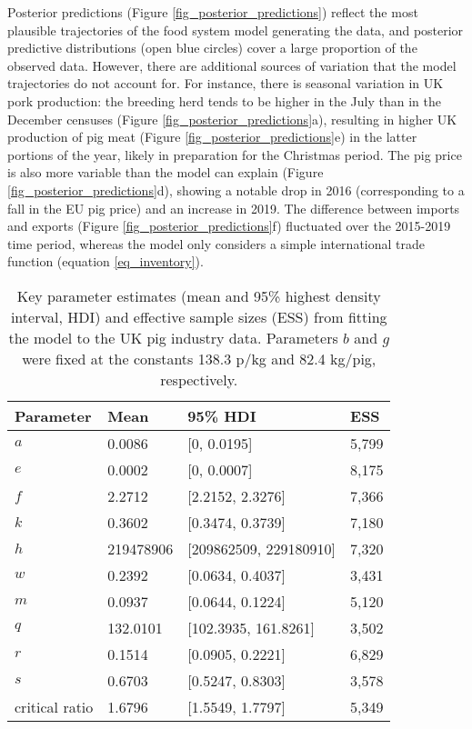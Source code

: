 \documentclass[12pt]{article}
\begin{document}
Posterior predictions (Figure \ref{fig_posterior_predictions}) reflect the most plausible trajectories of the food system model generating the data, and posterior predictive distributions (open blue circles) cover a large proportion of the observed data. However, there are additional sources of variation that the model trajectories do not account for. For instance, there is seasonal variation in UK pork production: the breeding herd tends to be higher in the July than in the December censuses (Figure \ref{fig_posterior_predictions}a), resulting in higher UK production of pig meat (Figure \ref{fig_posterior_predictions}e) in the latter portions of the year, likely in preparation for the Christmas period. The pig price is also more variable than the model can explain (Figure \ref{fig_posterior_predictions}d), showing a notable drop in 2016 (corresponding to a fall in the EU pig price) and an increase in 2019. The difference between imports and exports (Figure \ref{fig_posterior_predictions}f) fluctuated over the 2015-2019 time period, whereas the model only considers a simple international trade function (equation \ref{eq_inventory}).

\begin{table}[t!]
  \centering
  \footnotesize
  \begin{tabular}{p{5cm}p{3cm}p{5cm}p{2cm}}
    \textbf{Parameter} & \textbf{Mean} & \textbf{95\% HDI} & \textbf{ESS} \\ \hline
    $a$ & 0.0086 & [0, 0.0195] & 5,799 \\
    $e$ & 0.0002 & [0, 0.0007] & 8,175 \\
    $f$ & 2.2712 & [2.2152, 2.3276] & 7,366 \\
    $k$ & 0.3602 & [0.3474, 0.3739] & 7,180 \\
    $h$ & 219478906 & [209862509, 229180910] & 7,320 \\
    $w$ & 0.2392 & [0.0634, 0.4037] & 3,431 \\
    $m$ & 0.0937 & [0.0644, 0.1224] & 5,120 \\
    $q$ & 132.0101 & [102.3935, 161.8261] & 3,502 \\
    $r$ & 0.1514 & [0.0905, 0.2221] & 6,829 \\
    $s$ & 0.6703 & [0.5247, 0.8303] & 3,578 \\
    critical ratio & 1.6796 & [1.5549, 1.7797] & 5,349 \\
  \end{tabular}
  \caption{Key parameter estimates (mean and 95\% highest density interval, HDI) and effective sample sizes (ESS) from fitting the model to the UK pig industry data. Parameters $b$ and $g$ were fixed at the constants 138.3 p/kg and 82.4 kg/pig, respectively.}
  \label{table_parameter_estimates}
\end{table}
\end{document}

